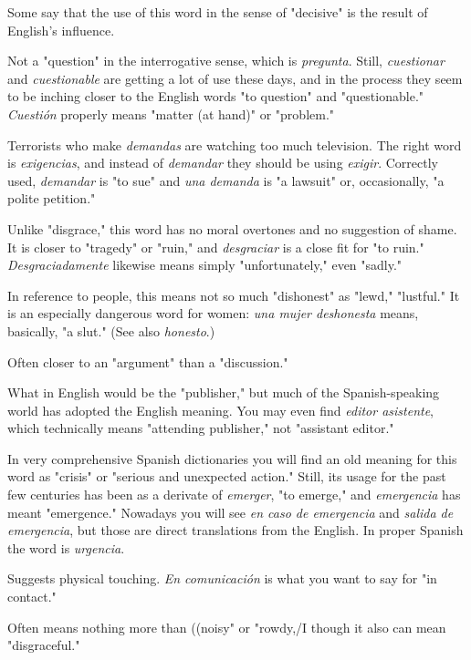  Some say that the use of this word in the sense of
"decisive" is the result of English's influence.

 Not a "question" in the interrogative sense,
which is \emph{pregunta}. Still, \emph{cuestionar} and \emph{cuestionable} are getting a
lot of use these days, and in the process they seem to be inching closer
to the English words "to question" and "questionable." \emph{Cuestión} properly means "matter (at hand)" or "problem."

 Terrorists who make \emph{demandas} are watching
too much television. The right word is \emph{exigencias}, and instead of
\emph{demandar} they should be using \emph{exigir}. Correctly used, \emph{demandar} is
"to sue" and \emph{una demanda} is "a lawsuit" or, occasionally, "a polite
petition."

 Unlike "disgrace," this word has no moral overtones and no suggestion of shame. It is closer to "tragedy" or "ruin,"
and \emph{desgraciar} is a close fit for "to ruin." \emph{Desgraciadamente} likewise
means simply "unfortunately," even "sadly."

 In reference to people, this means not so
much "dishonest" as "lewd," "lustful." It is an especially dangerous
word for women: \emph{una mujer deshonesta} means, basically, "a slut."
(See also \emph{honesto}.)

 Often closer to an "argument" than a "discussion."

 What in English would be the "publisher," but much
of the Spanish-speaking world has adopted the English meaning. You
may even find \emph{editor asistente}, which technically means "attending
publisher," not "assistant editor."

 In very comprehensive Spanish dictionaries
you will find an old meaning for this word as "crisis" or "serious and
unexpected action." Still, its usage for the past few centuries has been
as a derivate of \emph{emerger}, "to emerge," and \emph{emergencia} has meant
"emergence." Nowadays you will see \emph{en caso de emergencia} and \emph{salida de emergencia}, but those are direct translations from the English.
In proper Spanish the word is \emph{urgencia}.

 Suggests physical touching. \emph{En comunicación}
is what you want to say for "in contact."

 Often means nothing more than ((noisy" or
"rowdy,/I though it also can mean "disgraceful."

